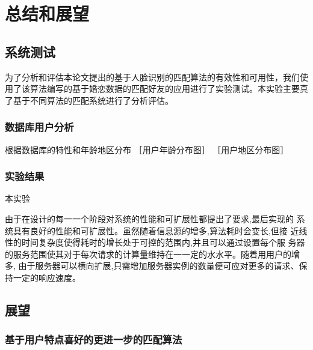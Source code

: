 
\chapter{总结和展望}
\section{系统测试}
为了分析和评估本论文提出的基于人脸识别的匹配算法的有效性和可用性，我们使用了该算法编写的基于婚恋数据的匹配好友的应用进行了实验测试。本实验主要真了基于不同算法的匹配系统进行了分析评估。
\subsection{数据库用户分析}
根据数据库的特性和年龄地区分布
［用户年龄分布图］
［用户地区分布图］
\subsection{实验结果}
本实验

由于在设计的每⼀一个阶段对系统的性能和可扩展性都提出了要求,最后实现的 系统具有良好的性能和可扩展性。虽然随着信息源的增多,算法耗时会变长,但接 近线性的时间复杂度使得耗时的增长处于可控的范围内,并且可以通过设置每个服 务器的服务范围使其对于每次请求的计算量维持在⼀一定的⽔水平。随着⽤用户的增多, 由于服务器可以横向扩展,只需增加服务器实例的数量便可应对更多的请求、保持一定的响应速度。



\section{展望}

\subsection{基于用户特点喜好的更进一步的匹配算法}
